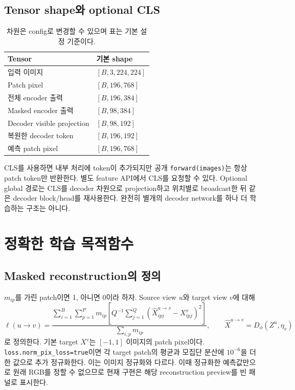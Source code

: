 \documentclass[11pt,a4paper]{article}
\newcommand{\code}[1]{\nolinkurl{#1}}
\begin{document}
\subsection{Tensor shape와 optional CLS}
\begin{table}[htbp]\centering\small
\begin{tabular}{ll}
\toprule Tensor & 기본 shape \\\midrule
입력 이미지 & $[B,3,224,224]$ \\
Patch pixel & $[B,196,768]$ \\
전체 encoder 출력 & $[B,196,384]$ \\
Masked encoder 출력 & $[B,98,384]$ \\
Decoder visible projection & $[B,98,192]$ \\
복원한 decoder token & $[B,196,192]$ \\
예측 patch pixel & $[B,196,768]$ \\\bottomrule
\end{tabular}
\caption{차원은 config로 변경할 수 있으며 표는 기본 설정 기준이다.}
\end{table}
CLS를 사용하면 내부 처리에 token이 추가되지만 공개 \code{forward(images)}는
항상 patch token만 반환한다. 별도 feature API에서 CLS를 요청할 수 있다.
Optional global 경로는 CLS를 decoder 차원으로 projection하고 위치별로 broadcast한
뒤 같은 decoder block/head를 재사용한다. 완전히 별개의 decoder network를
하나 더 학습하는 구조는 아니다.

\section{정확한 학습 목적함수}
\subsection{Masked reconstruction의 정의}
$m_{ip}$를 가린 patch이면 1, 아니면 0이라 하자. Source view $u$와 target view $v$에 대해
\begin{equation}\label{eq:rec}
\ell(u\!\to\!v)=
\frac{\sum_{i=1}^B\sum_{p=1}^P m_{ip}
\left[Q^{-1}\sum_{j=1}^Q(\widehat{X}^{u\to v}_{ipj}-X^v_{ipj})^2\right]}
{\sum_{i,p}m_{ip}},
\qquad \widehat{X}^{u\to v}=D_\phi(Z^u,\eta_v)
\end{equation}
로 정의한다. 기본 target $X^v$는 $[-1,1]$ 이미지의 patch pixel이다.
\code{loss.norm_pix_loss=true}이면 각 target patch의 평균과 모집단 분산에
$10^{-6}$을 더한 값으로 추가 정규화한다. 이는 이미지 정규화와 다르다.
이때 정규화한 예측값만으로 원래 RGB를 정할 수 없으므로 현재 구현은 해당
reconstruction preview를 빈 패널로 표시한다.
\end{document}
